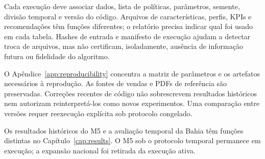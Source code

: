Cada execução deve associar dados, lista de políticas, parâmetros, semente, divisão temporal e versão do código. Arquivos de características, perfis, KPIs e recomendações têm funções diferentes; o relatório precisa indicar qual foi usado em cada tabela. Hashes de entrada e manifesto de execução ajudam a detectar troca de arquivos, mas não certificam, isoladamente, ausência de informação futura ou fidelidade do algoritmo.

O Apêndice~\ref{app:reproducibility} concentra a matriz de parâmetros e os artefatos necessários à reprodução. As fontes de vendas e PDFs de referência são preservadas. Correções recentes de código não sobrescrevem resultados históricos nem autorizam reinterpretá-los como novos experimentos. Uma comparação entre versões requer reexecução explícita sob protocolo congelado.

Os resultados históricos do M5 e a avaliação temporal da Bahia têm funções distintas no Capítulo~\ref{cap:results}. O M5 sob o protocolo temporal permanece em execução; a expansão nacional foi retirada da execução ativa.

